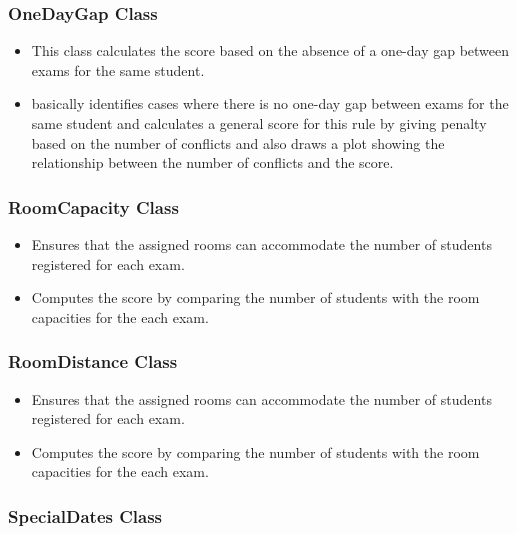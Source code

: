 \subsubsection{OneDayGap Class}


\begin{itemize}
\item This class calculates the score based on the absence of a one-day gap between exams for the same student.
\item basically identifies cases where there is no one-day gap between exams for the same student and calculates a general score for this rule by giving penalty based on the number of conflicts and also draws a plot showing the relationship between the number of conflicts and the score.
\end{itemize}

\subsubsection{RoomCapacity Class}


\begin{itemize}
\item Ensures that the assigned rooms can accommodate the number of students registered for each exam.
\item Computes the score by comparing the number of students with the room capacities for the each exam.
\end{itemize}

\subsubsection{RoomDistance Class}


\begin{itemize}
\item Ensures that the assigned rooms can accommodate the number of students registered for each exam.
\item Computes the score by comparing the number of students with the room capacities for the each exam.
\end{itemize}
\subsubsection{SpecialDates Class}



